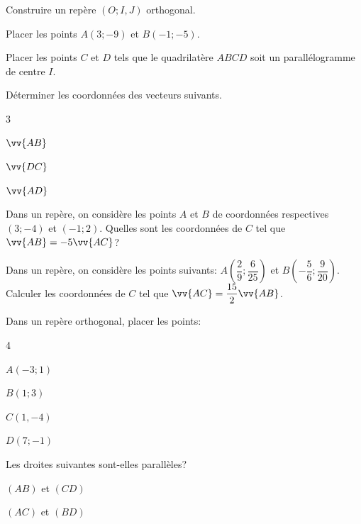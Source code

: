 \documentclass[11pt,a4paper]{article}  %
\begin{document}
\begin{exercice}{}
	Construire un repère $(O; I, J)$ orthogonal.
	\begin{enumMet}
		\item  Placer les points $A(3;-9)$  et $B(-1;-5)$. 
		\item Placer les points $C$ et $D$ tels que le quadrilatère $ABCD$ soit un parallélogramme de centre $I$.
		\item Déterminer les coordonnées des vecteurs suivants.  
		\begin{multicols}{3}
			\begin{enumMet}
				\item $\vv{AB}$\\
				\item $\vv{DC}$\\
				\item $\vv{AD}$\\ 
		\end{enumMet}
		\end{multicols}
	\end{enumMet}
\end{exercice}


\begin{exercice}{}
	Dans un repère, on considère les points $A$ et $B$ de coordonnées respectives $(3;-4)$ et $(-1; 2)$. Quelles sont les coordonnées de $C$ tel que $\vv{AB}=-5\vv{AC}$?
\end{exercice}

\begin{exercice}{}
	Dans un repère, on considère les points suivants: $A\left(\dfrac{2}{ 9};\dfrac{6}{25}\right)$ et $B\left(-\dfrac{5}{6};\dfrac{9}{20}\right)$.\\
	Calculer les coordonnées de $C$ tel que $\vv{AC}=\dfrac{15}{2}\vv{AB}$.
\end{exercice}

\begin{exercice}{}Dans un repère orthogonal, placer les points:
	\begin{multicols}{4}
		\begin{itemMet}
			\item $A(-3;1)$
			\item $B(1;3)$
			\item $C(1,-4)$
			\item $D(7;-1)$
		\end{itemMet}
	\end{multicols}
	Les droites suivantes sont-elles parallèles?
	\begin{enumMet}
		\item $(AB)$ et $(CD)$
		\item $(AC)$ et $(BD)$
	\end{enumMet}
\end{exercice}
\end{document}

